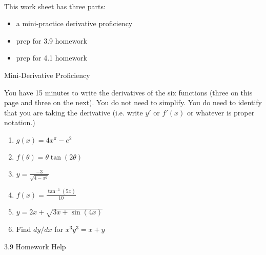 \documentclass[11pt,fleqn]{article}
\begin{document}
\renewcommand{\headrulewidth}{0pt}
\newcommand{\blank}[1]{\rule{#1}{0.75pt}}
\newcommand{\bc}{\begin{center}}
\newcommand{\ec}{\end{center}}
\renewcommand{\d}{\displaystyle}

\vspace*{-0.7in}

\begin{center}
  \large
  \\ 
\end{center}
 This work sheet has three parts:
 \begin{itemize}
 \item a mini-practice derivative proficiency
 \item prep for 3.9 homework
 \item prep for 4.1 homework
 \end{itemize}
  \begin{center} Mini-Derivative Proficiency \end{center}
You have 15 minutes to write the derivatives of the six functions (three on this page and three on the next). You do not need to simplify. You do need to identify that you are taking the derivative (i.e. write $y'$ or $f'(x)$ or whatever is proper notation.)

 \begin{enumerate}
 \item \large{$g(x)=4x^{\pi}-e^2$}
 \vfill
 \item  \large{$f(\theta)=\theta \tan (2 \theta)$}
 \vfill
 \item  \large{$\displaystyle{y=\frac{-3}{\sqrt{4-x^2}}}$}
 \vfill
 \newpage
 \item \large{$f(x)=\frac{\tan^{-1}(5x)}{10}$} 
 \vfill
 \item  \large{$y=2x+\sqrt{3x+\sin(4x)}$}
 \vfill
 \item Find $dy/dx$ for \large{$x^3 y^3=x+y$ }
 \vfill
 \end{enumerate}
 \newpage
 
 \begin{center} 3.9 Homework Help \end{center}
 
\end{document}
